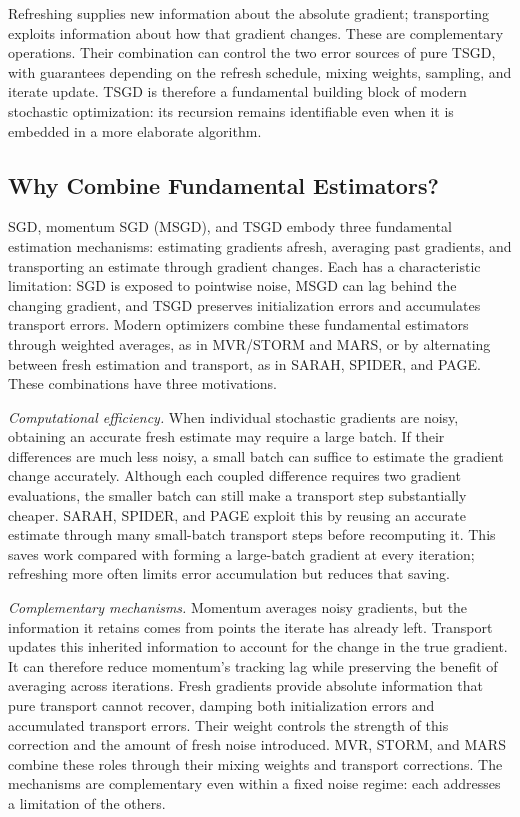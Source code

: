 Refreshing supplies new information about the absolute gradient;
transporting exploits information about how that gradient changes.
These are complementary operations. Their combination can control the
two error sources of pure TSGD, with guarantees depending on the refresh
schedule, mixing weights, sampling, and iterate update. TSGD is therefore
a fundamental building block of modern stochastic optimization: its
recursion remains identifiable even when it is embedded in a more
elaborate algorithm.

\subsection{Why Combine Fundamental Estimators?}
\label{subsec:why-combine-estimators}

SGD, momentum SGD (MSGD), and TSGD embody three fundamental estimation
mechanisms: estimating gradients afresh, averaging past gradients,
and transporting an estimate through gradient changes. Each has a
characteristic limitation: SGD is exposed to pointwise noise, MSGD
can lag behind the changing gradient, and TSGD preserves initialization
errors and accumulates transport errors. Modern optimizers combine
these fundamental estimators through weighted averages, as in
MVR/STORM and MARS, or by alternating between fresh estimation and
transport, as in SARAH, SPIDER, and PAGE. These combinations have
three motivations.

\emph{Computational efficiency.} When individual stochastic gradients
are noisy, obtaining an accurate fresh estimate may require a large
batch. If their differences are much less noisy, a small batch can
suffice to estimate the gradient change accurately. Although each
coupled difference requires two gradient evaluations, the smaller
batch can still make a transport step substantially cheaper. SARAH,
SPIDER, and PAGE exploit this by reusing an accurate estimate through
many small-batch transport steps before recomputing it. This saves
work compared with forming a large-batch gradient at every iteration;
refreshing more often limits error accumulation but reduces that saving.

\emph{Complementary mechanisms.} Momentum averages noisy gradients,
but the information it retains comes from points the iterate has
already left. Transport updates this inherited information to account
for the change in the true gradient. It can therefore reduce momentum's
tracking lag while preserving the benefit of averaging across iterations.
Fresh gradients provide absolute information that pure transport cannot
recover, damping both initialization errors and accumulated transport
errors. Their weight controls the strength of this correction and the
amount of fresh noise introduced. MVR, STORM, and MARS combine these
roles through their mixing weights and transport corrections. The
mechanisms are complementary even within a fixed noise regime: each
addresses a limitation of the others.

